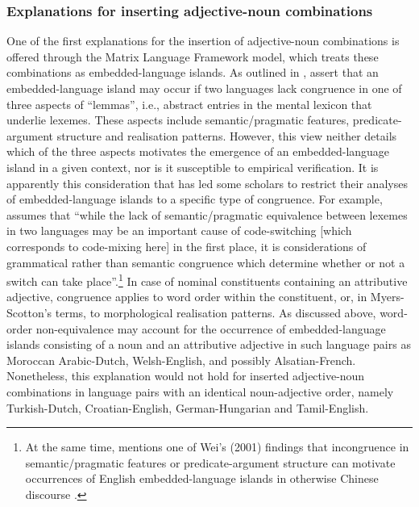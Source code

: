 \subsubsection{Explanations for inserting adjective-noun combinations}\label{explanations}
One of the first explanations for the insertion of adjective-noun combinations is offered through the Matrix Language Framework model, which treats these combinations as embedded-language islands. As outlined in , \citet{myers-scotton-matching-1995} assert that an embedded-language island may occur if two languages lack congruence in one of three aspects of ``lemmas'', i.e., abstract entries in the mental lexicon that underlie lexemes. These aspects include semantic/pragmatic features, predicate-argument structure and realisation patterns. However, this view neither details which of the three aspects motivates the emergence of an embedded-language island in a given context, nor is it susceptible to empirical verification. It is apparently this consideration that has led some scholars to restrict their analyses of embedded-language islands to a specific type of congruence. For example, \citet[][258]{deuchar-congruence-2005} assumes that ``while the lack of semantic/pragmatic equivalence between lexemes in two languages may be an important cause of code-switching [which corresponds to code-mixing here] in the first place, it is considerations of grammatical rather than semantic congruence which determine whether or not a switch can take place''.\footnote{At the same time, \citet{deuchar-congruence-2005} mentions one of Wei's (2001) findings that incongruence in semantic/pragmatic features or predicate-argument structure can motivate occurrences of English embedded-language islands in otherwise Chinese discourse \citep[quoted in][258]{deuchar-congruence-2005}.} In case of nominal constituents containing an attributive adjective, congruence applies to word order within the constituent, or, in Myers-Scotton's terms, to morphological realisation patterns. As discussed above, word-order non-equivalence may account for the occurrence of embedded-language islands consisting of a noun and an attributive adjective in such language pairs as Moroccan Arabic-Dutch, Welsh-English, and possibly Alsatian-French. Nonetheless, this explanation would not hold for inserted adjective-noun combinations in language pairs with an identical noun-adjective order, namely Turkish-Dutch, Croatian-English, German-Hungarian and Tamil-English.

